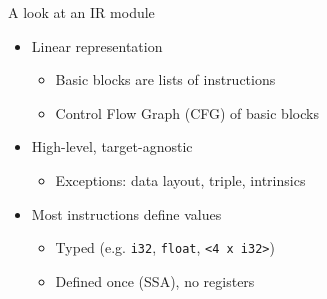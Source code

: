 
\begin{frame}[fragile]{A look at an IR module}

\begin{itemize}
    \item Linear representation
    \begin{itemize}
        \item Basic blocks are lists of instructions
        \item Control Flow Graph (CFG) of basic blocks
    \end{itemize}
    \item High-level, target-agnostic
    \begin{itemize}
        \item Exceptions: data layout, triple, intrinsics
    \end{itemize}
    \item Most instructions define values
    \begin{itemize}
        \item Typed (e.g. \texttt{i32}, \texttt{float}, \texttt{<4 x i32>})
        \item Defined once (SSA), no registers
    \end{itemize}
\end{itemize}



\end{frame}


